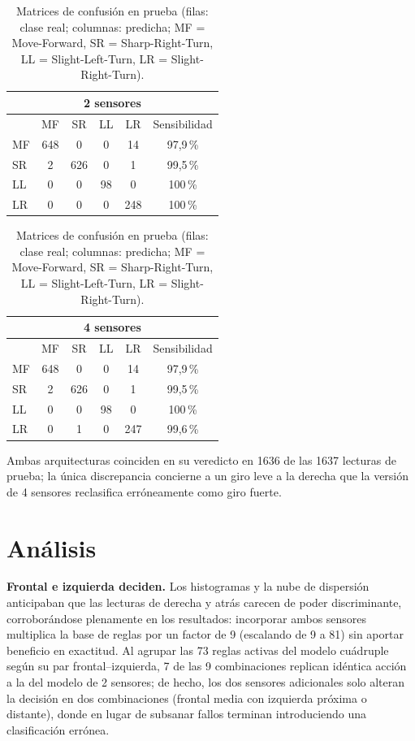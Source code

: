 \documentclass[11pt,letterpaper]{article}
\begin{document}
\begin{table}[H]
\centering
\caption{Matrices de confusión en prueba (filas: clase real; columnas: predicha; MF = Move-Forward, SR = Sharp-Right-Turn, LL = Slight-Left-Turn, LR = Slight-Right-Turn).}\label{tab:conf}
\begin{tabular}{l|cccc|c}
\multicolumn{6}{c}{\textbf{2 sensores}} \\
\toprule
 & MF & SR & LL & LR & Sensibilidad \\
\midrule
MF & 648 & 0 & 0 & 14 & 97,9\,\% \\
SR & 2 & 626 & 0 & 1 & 99,5\,\% \\
LL & 0 & 0 & 98 & 0 & 100\,\% \\
LR & 0 & 0 & 0 & 248 & 100\,\% \\
\bottomrule
\end{tabular}
\qquad
\begin{tabular}{l|cccc|c}
\multicolumn{6}{c}{\textbf{4 sensores}} \\
\toprule
 & MF & SR & LL & LR & Sensibilidad \\
\midrule
MF & 648 & 0 & 0 & 14 & 97,9\,\% \\
SR & 2 & 626 & 0 & 1 & 99,5\,\% \\
LL & 0 & 0 & 98 & 0 & 100\,\% \\
LR & 0 & 1 & 0 & 247 & 99,6\,\% \\
\bottomrule
\end{tabular}
\end{table}

Ambas arquitecturas coinciden en su veredicto en 1636 de las 1637 lecturas de prueba; la única discrepancia concierne a un giro leve a la derecha que la versión de 4 sensores reclasifica erróneamente como giro fuerte.

\section{Análisis}

\textbf{Frontal e izquierda deciden.} Los histogramas y la nube de dispersión anticipaban que las lecturas de derecha y atrás carecen de poder discriminante, corroborándose plenamente en los resultados: incorporar ambos sensores multiplica la base de reglas por un factor de 9 (escalando de 9 a 81) sin aportar beneficio en exactitud. Al agrupar las 73 reglas activas del modelo cuádruple según su par frontal--izquierda, 7 de las 9 combinaciones replican idéntica acción a la del modelo de 2 sensores; de hecho, los dos sensores adicionales solo alteran la decisión en dos combinaciones (frontal media con izquierda próxima o distante), donde en lugar de subsanar fallos terminan introduciendo una clasificación errónea.
\end{document}
